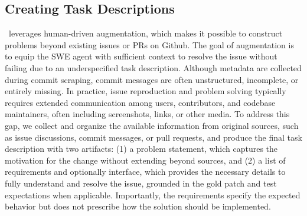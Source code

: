 \subsection{Creating Task Descriptions}
\benchmarkname~leverages human-driven augmentation, which makes it possible to construct problems beyond existing issues or PRs on Github. The goal of augmentation is to equip the SWE agent with sufficient context to resolve the issue without failing due to an underspecified task description. Although metadata are collected during commit scraping, commit messages are often unstructured, incomplete, or entirely missing. In practice, issue reproduction and problem solving typically requires extended communication among users, contributors, and codebase maintainers, often including screenshots, links, or other media. To address this gap, we collect and organize the available information from original sources, such as issue discussions, commit messages, or pull requests, and produce the final task description with two artifacts: (1) a problem statement, which captures the motivation for the change without extending beyond sources, and (2) a list of requirements and optionally interface, which provides the necessary details to fully understand and resolve the issue, grounded in the gold patch and test expectations when applicable. Importantly, the requirements specify the expected behavior but does not prescribe how the solution should be implemented.

